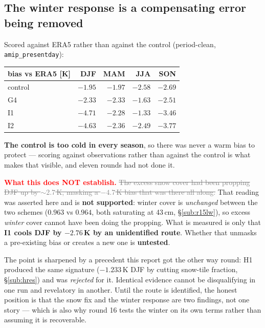\documentclass[10pt]{article}
\newcommand{\dead}[1]{\textcolor{gray}{\sout{#1}}}
\begin{document}
\subsection{The winter response is a compensating error being removed}\label{sub:r15compensate}
Scored against ERA5 rather than against the control (period-clean, \texttt{amip\_presentday}):

\begin{center}\footnotesize
\begin{tabular}{l r r r r}
\toprule
bias vs ERA5 [K] & DJF & MAM & JJA & SON \\
\midrule
control & $-1.95$ & $-1.97$ & $-2.58$ & $-2.69$ \\
G4 & $-2.33$ & $-2.33$ & $\mathbf{-1.63}$ & $-2.51$ \\
I1 & $\mathbf{-4.71}$ & $-2.28$ & $\mathbf{-1.33}$ & $-3.46$ \\
I2 & $-4.63$ & $-2.36$ & $-2.49$ & $-3.77$ \\
\bottomrule
\end{tabular}
\end{center}

\noindent \textbf{The control is too cold in every season}, so there was never a warm bias to
protect --- scoring against observations rather than against the control is what makes that
visible, and eleven rounds had not done it.

\textcolor{red}{\textbf{What this does NOT establish.}}
\dead{The excess snow cover had been propping DJF up by ${\sim}2.7$\,K, masking a $-4.7$\,K
bias that was there all along.} That reading was asserted here and is \textbf{not supported}:
winter cover is \emph{unchanged} between the two schemes ($0.963$ vs $0.964$, both saturating
at 43\,cm, \S\ref{sub:r15lw}), so excess \emph{winter} cover cannot have been doing the
propping. What is measured is only that \textbf{I1 cools DJF by $-2.76$\,K by an unidentified
route}. Whether that unmasks a pre-existing bias or creates a new one is \textbf{untested}.

The point is sharpened by a precedent this report got the other way round: H1 produced the
same signature ($-1.233$\,K DJF by cutting snow-tile fraction, \S\ref{sub:hres}) and was
\emph{rejected} for it. Identical evidence cannot be disqualifying in one run and revelatory
in another. Until the route is identified, the honest position is that the snow fix and the
winter response are two findings, not one story --- which is also why round 16 tests the
winter on its own terms rather than assuming it is recoverable.
\end{document}
